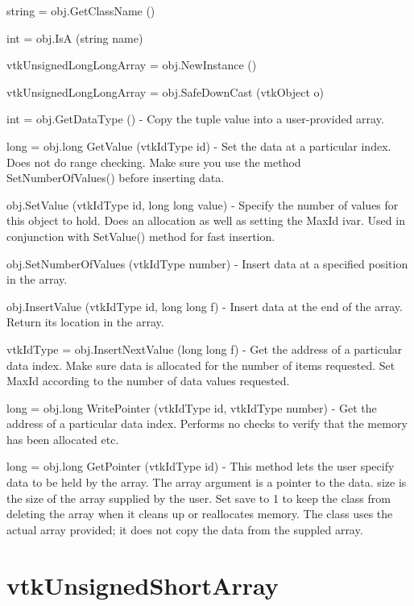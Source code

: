 \begin{DoxyItemize}
\item {\ttfamily string = obj.\-Get\-Class\-Name ()}  
\item {\ttfamily int = obj.\-Is\-A (string name)}  
\item {\ttfamily vtk\-Unsigned\-Long\-Long\-Array = obj.\-New\-Instance ()}  
\item {\ttfamily vtk\-Unsigned\-Long\-Long\-Array = obj.\-Safe\-Down\-Cast (vtk\-Object o)}  
\item {\ttfamily int = obj.\-Get\-Data\-Type ()} -\/ Copy the tuple value into a user-\/provided array.  
\item {\ttfamily long = obj.\-long Get\-Value (vtk\-Id\-Type id)} -\/ Set the data at a particular index. Does not do range checking. Make sure you use the method Set\-Number\-Of\-Values() before inserting data.  
\item {\ttfamily obj.\-Set\-Value (vtk\-Id\-Type id, long long value)} -\/ Specify the number of values for this object to hold. Does an allocation as well as setting the Max\-Id ivar. Used in conjunction with Set\-Value() method for fast insertion.  
\item {\ttfamily obj.\-Set\-Number\-Of\-Values (vtk\-Id\-Type number)} -\/ Insert data at a specified position in the array.  
\item {\ttfamily obj.\-Insert\-Value (vtk\-Id\-Type id, long long f)} -\/ Insert data at the end of the array. Return its location in the array.  
\item {\ttfamily vtk\-Id\-Type = obj.\-Insert\-Next\-Value (long long f)} -\/ Get the address of a particular data index. Make sure data is allocated for the number of items requested. Set Max\-Id according to the number of data values requested.  
\item {\ttfamily long = obj.\-long Write\-Pointer (vtk\-Id\-Type id, vtk\-Id\-Type number)} -\/ Get the address of a particular data index. Performs no checks to verify that the memory has been allocated etc.  
\item {\ttfamily long = obj.\-long Get\-Pointer (vtk\-Id\-Type id)} -\/ This method lets the user specify data to be held by the array. The array argument is a pointer to the data. size is the size of the array supplied by the user. Set save to 1 to keep the class from deleting the array when it cleans up or reallocates memory. The class uses the actual array provided; it does not copy the data from the suppled array.  
\end{DoxyItemize}\hypertarget{vtkcommon_vtkunsignedshortarray}{}\section{vtk\-Unsigned\-Short\-Array}\label{vtkcommon_vtkunsignedshortarray}
